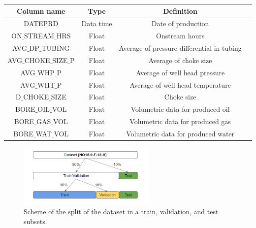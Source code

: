 \begin{center}
\begin{tabular}{ |c|c|c|c| } 
\hline
Column name & Type & Definition \\
\hline
DATEPRD & Data time & Date of production \\ 
ON$\_$STREAM$\_$HRS & Float & Onstream hours  \\ 
AVG$\_$DP$\_$TUBING & Float & Average of pressure differential in tubing \\ 
AVG$\_$CHOKE$\_$SIZE$\_$P & Float & Average of choke size                \\ 
AVG$\_$WHP$\_$P & Float & Average of well head pressure                  \\ 
AVG$\_$WHT$\_$P & Float & Average of well head temperature               \\ 
D$\_$CHOKE$\_$SIZE & Float & Choke size \\ 
BORE$\_$OIL$\_$VOL & Float & Volumetric data for produced oil \\ 
BORE$\_$GAS$\_$VOL & Float & Volumetric data for produced gas \\ 
BORE$\_$WAT$\_$VOL & Float & Volumetric data for produced water \\
\hline
\end{tabular}
\label{tab:Features}
\end{center}

\begin{figure}[h!]
    \centering
    \includegraphics[width=0.6\textwidth]{images/dataset_split.png}
    \caption{Scheme of the split of the dataset in a train, validation, and test subsets.}
    \label{fig:data_split}
\end{figure}